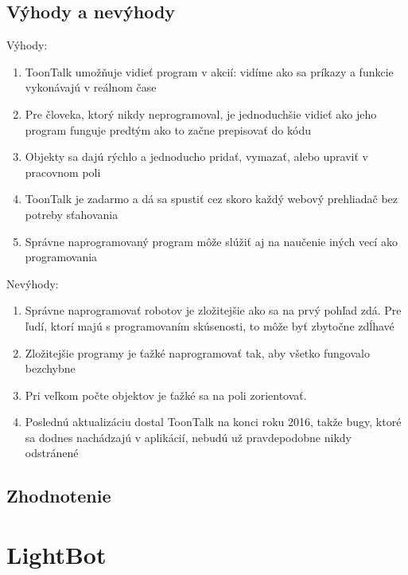 \documentclass[slovak,a4paper,11pt]{article}
\begin{document}
\subsection{Výhody a nevýhody}
Výhody:
\begin{enumerate}
\item ToonTalk umožňuje vidieť program v akcií: vidíme ako sa príkazy a funkcie vykonávajú v reálnom čase
\item Pre človeka, ktorý nikdy neprogramoval, je jednoduchšie vidieť ako jeho program funguje predtým ako to začne prepisovať do kódu
\item Objekty sa dajú rýchlo a jednoducho pridať, vymazať, alebo upraviť v pracovnom poli 
\item ToonTalk je zadarmo a dá sa spustiť cez skoro každý webový prehliadač bez potreby sťahovania
\item Správne naprogramovaný program môže slúžiť aj na naučenie iných vecí ako programovania
\end{enumerate}
Nevýhody:
\begin{enumerate}
\item Správne naprogramovať robotov je zložitejšie ako sa na prvý pohľad zdá. Pre ľudí, ktorí majú s programovaním skúsenosti, to môže byť zbytočne zdĺhavé
\item Zložitejšie programy je ťažké naprogramovať tak, aby všetko fungovalo bezchybne
\item Pri veľkom počte objektov je ťažké sa na poli zorientovať.
\item Poslednú aktualizáciu dostal ToonTalk na konci roku 2016, takže bugy, ktoré sa dodnes nachádzajú v aplikácií, nebudú už pravdepodobne nikdy odstránené
\end{enumerate}
\subsection{Zhodnotenie}
\section{LightBot}
\end{document}
